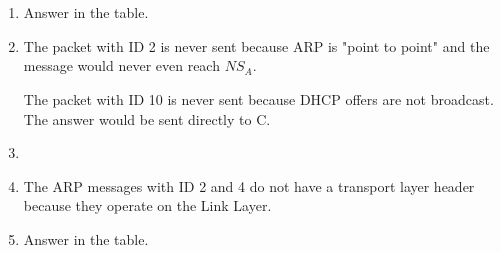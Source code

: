 \documentclass[12pt, a4paper]{article}
\begin{document}
\section{} %
\begin{enumerate}
	\item %
	Answer in the table.

	\item %
	The packet with ID 2 is never sent because ARP is "point to point" and the message would never even reach $NS_A$.

	The packet with ID 10 is never sent because DHCP offers are not broadcast. The answer would be sent directly to C.

	\item %
	\item %
	The ARP messages with ID 2 and 4 do not have a transport layer header because they operate on the Link Layer.

	\item %
	Answer in the table.
\end{enumerate}
\end{document}
